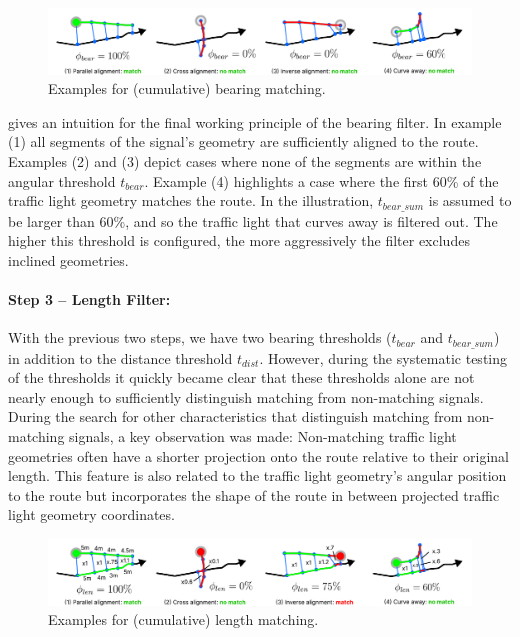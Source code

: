 \begin{figure}[htbp]
\centering
\includegraphics[width=\linewidth]{images/sg-selection-bearing-filter-sum.pdf}
\caption{Examples for (cumulative) bearing matching.}
\label{fig:sg-selection-bearing-filter-sum}
\end{figure}

 gives an intuition for the final working principle of the bearing filter. In example (1) all segments of the signal's geometry are sufficiently aligned to the route. Examples (2) and (3) depict cases where none of the segments are within the angular threshold $t_{bear}$. Example (4) highlights a case where the first 60\% of the traffic light geometry matches the route. In the illustration, $t_{bear\_sum}$ is assumed to be larger than 60\%, and so the traffic light that curves away is filtered out. The higher this threshold is configured, the more aggressively the filter excludes inclined geometries.

\paragraph{Step 3 -- Length Filter:} With the previous two steps, we have two bearing thresholds ($t_{bear}$ and $t_{bear\_sum}$) in addition to the distance threshold $t_{dist}$. However, during the systematic testing of the thresholds it quickly became clear that these thresholds alone are not nearly enough to sufficiently distinguish matching from non-matching signals. During the search for other characteristics that distinguish matching from non-matching signals, a key observation was made: Non-matching traffic light geometries often have a shorter projection onto the route relative to their original length. This feature is also related to the traffic light geometry's angular position to the route but incorporates the shape of the route in between projected traffic light geometry coordinates.

\begin{figure}[htbp]
\centering
\includegraphics[width=\linewidth]{images/sg-selection-length-filter-sum.pdf}
\caption{Examples for (cumulative) length matching.}
\label{fig:sg-selection-length-filter-sum}
\end{figure}


